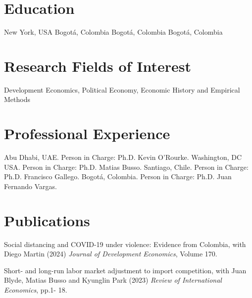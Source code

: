 \documentclass{moderncv}
\begin{document}
\maketitle
\section{\textbf{Education}}
 {New York, USA}{}{}
 {Bogot\'a, Colombia}{}{}
 {Bogot\'a, Colombia}{}{}
 {Bogot\'a, Colombia}{}{}

\section{\textbf{Research Fields of Interest}}
{Development Economics,  Political Economy,  Economic History and Empirical Methods }

\section{\textbf{Professional Experience}}
 {}{}{Abu Dhabi, UAE. Person in Charge: Ph.D. Kevin O'Rourke.}
 {}{}{Washington, DC USA. Person in Charge: Ph.D. Matias Busso.}
 {}{}{Santiago, Chile. Person in Charge: Ph.D. Francisco Gallego.}
 {}{}{Bogot\'a, Colombia. Person in Charge: Ph.D. Juan Fernando Vargas.}

\section{\textbf{Publications}}

{Social distancing and COVID-19 under violence: Evidence from Colombia, with Diego Martin (2024) \emph{Journal of Development Economics}, Volume 170. \\}

{Short- and long-run labor market adjustment to import competition, with Juan Blyde, Matias Busso and Kyunglin Park (2023) \emph{Review of International Economics}, pp.1- 18. \\}
\end{document}
